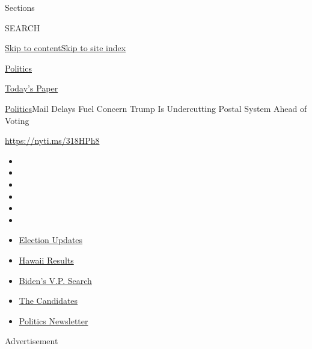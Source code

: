 Sections

SEARCH

\protect\hyperlink{site-content}{Skip to
content}\protect\hyperlink{site-index}{Skip to site index}

\href{https://www.nytimes.com/section/politics}{Politics}

\href{https://myaccount.nytimes.com/auth/login?response_type=cookie\&client_id=vi}{}

\href{https://www.nytimes.com/section/todayspaper}{Today's Paper}

\href{/section/politics}{Politics}\textbar{}Mail Delays Fuel Concern
Trump Is Undercutting Postal System Ahead of Voting

\href{https://nyti.ms/318HPh8}{https://nyti.ms/318HPh8}

\begin{itemize}
\item
\item
\item
\item
\item
\item
\end{itemize}

\begin{itemize}
\item
  \href{https://www.nytimes.com/2020/08/07/us/elections/biden-vs-trump.html?action=click\&pgtype=Article\&state=default\&region=TOP_BANNER\&context=storylines_menu}{Election
  Updates}
\item
  \href{https://www.nytimes.com/interactive/2020/08/08/us/elections/results-hawaii-primary-elections.html?action=click\&pgtype=Article\&state=default\&region=TOP_BANNER\&context=storylines_menu}{Hawaii
  Results}
\item
  \href{https://www.nytimes.com/article/biden-vice-president-2020.html?action=click\&pgtype=Article\&state=default\&region=TOP_BANNER\&context=storylines_menu}{Biden's
  V.P. Search}
\item
  \href{https://www.nytimes.com/interactive/2019/us/politics/2020-presidential-candidates.html?action=click\&pgtype=Article\&state=default\&region=TOP_BANNER\&context=storylines_menu}{The
  Candidates}
\item
  \href{https://www.nytimes.com/newsletters/politics?action=click\&pgtype=Article\&state=default\&region=TOP_BANNER\&context=storylines_menu}{Politics
  Newsletter}
\end{itemize}

Advertisement

